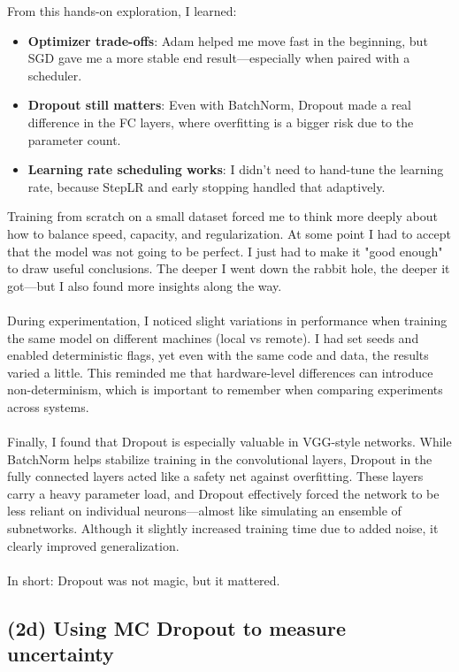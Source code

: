 \documentclass[10pt]{article}
\begin{document}
\vspace{0.5em}
\noindent From this hands-on exploration, I learned:
\begin{itemize}
  \item \textbf{Optimizer trade-offs}: Adam helped me move fast in the beginning, but SGD gave me a more stable end result—especially when paired with a scheduler.
  \item \textbf{Dropout still matters}: Even with BatchNorm, Dropout made a real difference in the FC layers, where overfitting is a bigger risk due to the parameter count.
  \item \textbf{Learning rate scheduling works}: I didn’t need to hand-tune the learning rate, because StepLR and early stopping handled that adaptively.
\end{itemize}
Training from scratch on a small dataset forced me to think more deeply about how to balance speed, capacity, and regularization. At some point I had to accept that the model was not going to be perfect. I just had to make it "good enough" to draw useful conclusions. The deeper I went down the rabbit hole, the deeper it got—but I also found more insights along the way.\\
\\
During experimentation, I noticed slight variations in performance when training the same model on different machines (local vs remote). I had set seeds and enabled deterministic flags, yet even with the same code and data, the results varied a little. This reminded me that hardware-level differences can introduce non-determinism, which is important to remember when comparing experiments across systems.\\
\\
Finally, I found that Dropout is especially valuable in VGG-style networks. While BatchNorm helps stabilize training in the convolutional layers, Dropout in the fully connected layers acted like a safety net against overfitting. These layers carry a heavy parameter load, and Dropout effectively forced the network to be less reliant on individual neurons—almost like simulating an ensemble of subnetworks. Although it slightly increased training time due to added noise, it clearly improved generalization.\\
\\
In short: Dropout was not magic, but it mattered.
\subsection*{(2d) Using MC Dropout to measure uncertainty}
\end{document}
